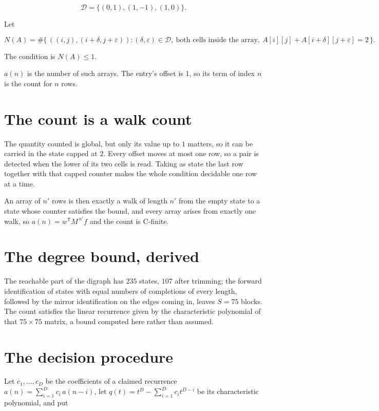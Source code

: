 \documentclass[11pt]{article}
\theoremstyle{definition}
\begin{document}
\[\mathcal{D} = \{(0,1), (1,-1), (1,0)\}.\]

Let

\[N(A) = \#\bigl\{\,((i,j),(i{+}\delta,j{+}\varepsilon)) : (\delta,\varepsilon) \in \mathcal{D},\ \text{both cells inside the array},\ A[i][j] + A[i{+}\delta][j{+}\varepsilon] = 2\,\bigr\}.\]

The condition is $N(A) \le 1$.

$a(n)$ is the number of such arrays. The entry's offset is 1, so its term of index $n$ is the count for $n$ rows.

\section{The count is a walk count}

The quantity counted is global, but only its value up to $1$ matters, so it can be carried in the state capped at $2$. Every offset moves at most one row, so a pair is detected when the lower of its two cells is read. Taking as state the last row together with that capped counter makes the whole condition decidable one row at a time.

An array of $n'$ rows is then exactly a walk of length $n'$ from the empty state to a state whose counter satisfies the bound, and every array arises from exactly one walk, so $a(n) = w^{\mathsf T}M^{\,n'}f$ and the count is C-finite.

\section{The degree bound, derived}

The reachable part of the digraph has $235$ states, $107$ after trimming; the forward identification of states with equal numbers of completions of every length, followed by the mirror identification on the edges coming in, leaves $S = 75$ blocks. The count satisfies the linear recurrence given by the characteristic polynomial of that $75\times75$ matrix, a bound computed here rather than assumed.

\section{The decision procedure}

Let $c_1,\dots,c_D$ be the coefficients of a claimed recurrence $a(n) = \sum_{i=1}^{D} c_i\,a(n-i)$, let $q(t) = t^{D} - \sum_{i=1}^{D} c_i t^{D-i}$ be its characteristic polynomial, and put
\end{document}
